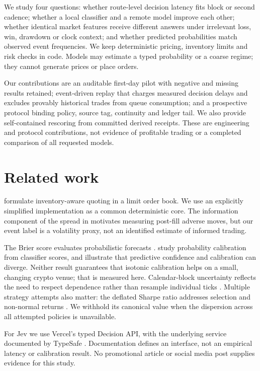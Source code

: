 \documentclass[11pt]{article}
\begin{document}
We study four questions: whether route-level decision latency fits block or
second cadence; whether a local classifier and a remote model improve each other;
whether identical market features receive different answers under irrelevant
loss, win, drawdown or clock context; and whether predicted probabilities match
observed event frequencies. We keep deterministic pricing, inventory limits and
risk checks in code. Models may estimate a typed probability or a coarse regime;
they cannot generate prices or place orders.

Our contributions are an auditable first-day pilot with negative and missing
results retained; event-driven replay that charges measured decision delays and
excludes provably historical trades from queue consumption; and a prospective
protocol binding policy, source tag, continuity and ledger tail. We also provide
self-contained rescoring from committed derived receipts. These are engineering
and protocol contributions, not evidence of profitable trading or a completed
comparison of all requested models.

\section{Related work}
\citet{avellaneda2008} formulate inventory-aware quoting in a limit order book.
We use an explicitly simplified implementation as a common deterministic core.
The information component of the spread in \citet{glosten1985} motivates measuring
post-fill adverse moves, but our event label is a volatility proxy, not an
identified estimate of informed trading.

The Brier score evaluates probabilistic forecasts \citep{brier1950}.
\citet{zadrozny2002} study probability calibration from classifier scores, and
\citet{guo2017} illustrate that predictive confidence and calibration can diverge.
Neither result guarantees that isotonic calibration helps on a small, changing
crypto venue; that is measured here. Calendar-block uncertainty reflects the need
to respect dependence rather than resample individual ticks \citep{kunsch1989}.
Multiple strategy attempts also matter: the deflated Sharpe ratio addresses
selection and non-normal returns \citep{bailey2014}. We withhold its canonical
value when the dispersion across all attempted policies is unavailable.

For Jev we use Vercel's typed Decision API, with the underlying service
documented by TypeSafe \citep{typesafe,vercel}. Documentation defines an interface,
not an empirical latency or calibration result. No promotional article or social
media post supplies evidence for this study.
\end{document}
